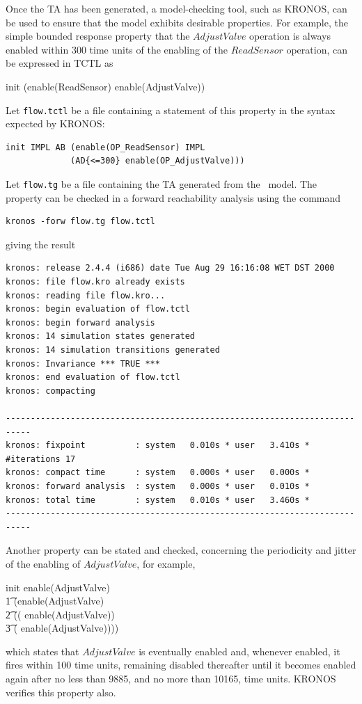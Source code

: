 Once the TA has been generated, a model-checking tool, such as KRONOS,
can be used to ensure that the model exhibits desirable properties.
For example, the simple bounded response property that the $AdjustValve$
operation is always enabled within 300 time units of the enabling of the
$ReadSensor$ operation, can be expressed in TCTL as
\begin{zed}
init \implies \aalways{} (enable(ReadSensor) \implies 
               enable(AdjustValve))
\end{zed}
Let {\tt flow.tctl} be a file containing a statement of this property
in the syntax expected by KRONOS:
\begin{verbatim}
init IMPL AB (enable(OP_ReadSensor) IMPL 
             (AD{<=300} enable(OP_AdjustValve)))
\end{verbatim}
Let {\tt flow.tg} be a file containing the TA generated from the 
\bcandle\ model.
The property can be checked in a forward reachability analysis using the
command
\begin{verbatim} 
kronos -forw flow.tg flow.tctl
\end{verbatim}
giving the result
{
\scriptsize
\begin{verbatim} 
kronos: release 2.4.4 (i686) date Tue Aug 29 16:16:08 WET DST 2000
kronos: file flow.kro already exists 
kronos: reading file flow.kro...
kronos: begin evaluation of flow.tctl
kronos: begin forward analysis
kronos: 14 simulation states generated
kronos: 14 simulation transitions generated
kronos: Invariance *** TRUE ***
kronos: end evaluation of flow.tctl
kronos: compacting

---------------------------------------------------------------------------
kronos: fixpoint          : system   0.010s * user   3.410s * #iterations 17
kronos: compact time      : system   0.000s * user   0.000s *
kronos: forward analysis  : system   0.000s * user   0.010s *
kronos: total time        : system   0.010s * user   3.460s *
---------------------------------------------------------------------------
\end{verbatim}
} 

Another property can be stated and checked, concerning the
periodicity and jitter of the enabling of $AdjustValve$, for example,
\begin{zed}
init \implies \aeventually{} enable(AdjustValve) \land \\
\t1 \aalways{} (enable(AdjustValve) \implies \\ 
\t2               (( \lnot enable(AdjustValve)) \land \\
\t3 \hspace*{2ex}\;( enable(AdjustValve))))
\end{zed}
which states that $AdjustValve$ is eventually enabled and, whenever
enabled, it fires within 100 time units, remaining disabled thereafter
until it becomes enabled again after no less than 9885, and no more
than 10165, time units. KRONOS verifies this property also.

